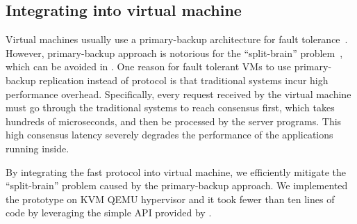 \subsection{Integrating \xxx into virtual machine} \label{sec:vm-integration}
Virtual machines usually use a primary-backup architecture for fault 
tolerance~\cite{alsberg1976principle}. However, primary-backup approach is 
notorious for the ``split-brain'' problem~\cite{scales2010design}, which can be 
avoided in \paxos. One reason for fault tolerant VMs to use 
primary-backup replication instead of \paxos protocol is that traditional \paxos 
systems incur high performance overhead. Specifically, every 
request received by the virtual machine must go through the traditional \paxos 
systems to reach consensus first, which takes hundreds of microseconds, and then 
be processed by the server programs. This high consensus latency severely 
degrades the performance of the applications running inside.

By integrating the fast \xxx \paxos protocol into virtual machine, we 
efficiently mitigate the ``split-brain'' problem caused by the primary-backup 
approach. We implemented the prototype on KVM QEMU hypervisor and it took fewer 
than ten lines of code by leveraging the simple API provided by \xxx.
